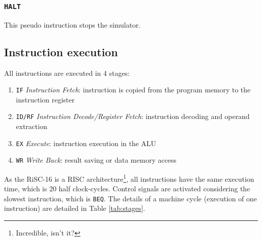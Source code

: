 \documentclass[10pt,a4paper]{article}
\theoremstyle{definition}%
\begin{document}
\subsubsection{\texttt{HALT}}
This pseudo instruction stops the simulator.
\subsection{Instruction execution}
All instructions are executed in 4 stages:
\begin{enumerate}
\item \verb!IF! \textit{Instruction Fetch}: instruction is copied from the program memory to the instruction register
\item \verb!ID/RF! \textit{Instruction Decode/Register Fetch}: instruction decoding and operand extraction
\item \verb!EX!	\textit{Execute}: instruction execution in the ALU
\item \verb!WR! \textit{Write Back}: result saving or data memory access
\end{enumerate}

As the RiSC-16 is a RISC architecture\footnote{Incredible, isn't it?}, all instructions have the same execution time, which is 20 half clock-cycles. Control signals are activated considering the slowest instruction, which is \verb!BEQ!. The details of a machine cycle (execution of one instruction) are detailed in Table \vref{tab:stages}.
\end{document}
